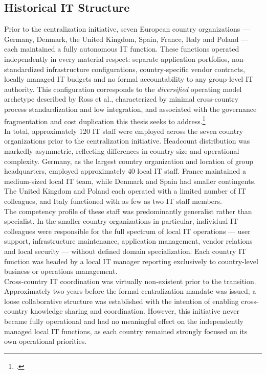 \subsection{Historical IT Structure}
\label{subsec:HistoricalITStructure}
Prior to the centralization initiative, seven European country organizations — Germany, Denmark, the United Kingdom, Spain, France, Italy and Poland — each maintained a fully autonomous IT function.
These functions operated independently in every material respect: separate application portfolios, non-standardized infrastructure configurations, country-specific vendor contracts, locally managed IT budgets and no formal accountability to any group-level IT authority.
This configuration corresponds to the \textit{diversified} operating model archetype described by Ross et al., characterized by minimal cross-country process standardization and low integration, and associated with the governance fragmentation and cost duplication this thesis seeks to address.\footcite[3-4]{rossForgetStrategyFocus2005}
\\
In total, approximately 120 IT staff were employed across the seven country organizations prior to the centralization initiative.
Headcount distribution was markedly asymmetric, reflecting differences in country size and operational complexity.
Germany, as the largest country organization and location of group headquarters, employed approximately 40 local IT staff.
France maintained a medium-sized local IT team, while Denmark and Spain had smaller contingents.
The United Kingdom and Poland each operated with a limited number of IT colleagues, and Italy functioned with as few as two IT staff members.
\\
The competency profile of these staff was predominantly generalist rather than specialist.
In the smaller country organizations in particular, individual IT colleagues were responsible for the full spectrum of local IT operations — user support, infrastructure maintenance, application management, vendor relations and local security — without defined domain specialization.
Each country IT function was headed by a local IT manager reporting exclusively to country-level business or operations management.
\\
Cross-country IT coordination was virtually non-existent prior to the transition.
Approximately two years before the formal centralization mandate was issued, a loose collaborative structure was established with the intention of enabling cross-country knowledge sharing and coordination.
However, this initiative never became fully operational and had no meaningful effect on the independently managed local IT functions, as each country remained strongly focused on its own operational priorities.
